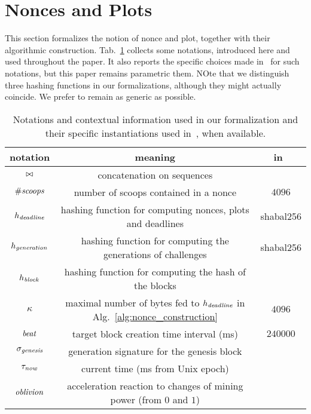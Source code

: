 \section{Nonces and Plots}\label{sec:nonces_and_plots}

This section formalizes the notion of nonce and plot, together with their
algorithmic construction. Tab.~\ref{tab:notations} collects some notations,
introduced here and used throughout the paper.
It also reports the specific choices
made in~\cite{SignumPlotting} for such notations, but this paper remains parametric \wrt them.
NOte that we distinguish three hashing functions in our formalizations, although they
might actually coincide. We prefer to remain as generic as possible.

\begin{table}[t]
\begin{center}
\begin{tabular}{|c|c|c|}
  \hline
  \textbf{notation} & \textbf{meaning} & \textbf{in~\cite{SignumPlotting}}\\\hline\hline

  $\operatorname*{\bowtie}$ & concatenation on sequences & \\\hline
  ${\#\mathit{scoops}}$ & number of scoops contained in a nonce & $4096$\\\hline

  $h_{\mathit{deadline}}$ & hashing function for computing nonces, plots and deadlines & shabal256\\\hline

  $h_{\mathit{generation}}$ & hashing function for computing the generations of challenges & shabal256\\\hline

  $h_{\mathit{block}}$ & hashing function for computing the hash of the blocks & \\\hline

  $\kappa$ & maximal number of bytes fed to $h_{\mathit{deadline}}$ in Alg.~\ref{alg:nonce_construction} & $4096$\\\hline

  ${\mathit{beat}}$ & target block creation time interval (ms) & $240000$ \\\hline

  $\sigma_{\mathit{genesis}}$ & generation signature for the genesis block & \\\hline

  $\tau_{\mathit{now}}$ & current time (ms from Unix epoch) & \\\hline

  ${\mathit{oblivion}}$ & acceleration reaction to changes of mining power (from $0$ and $1$) & \\\hline
\end{tabular}
\end{center}
\caption{Notations and contextual information used in our formalization and their specific instantiations
  used in~\cite{SignumPlotting}, when available.}
\label{tab:notations}
\end{table}
